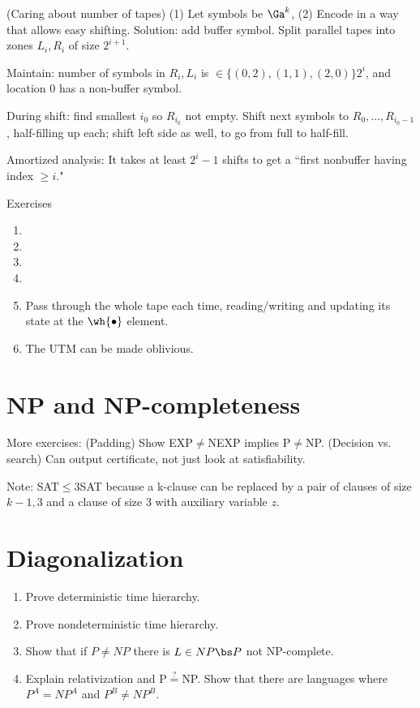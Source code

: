 (Caring about number of tapes) (1) Let symbols be $\Ga^k$, (2) Encode in a way that allows easy shifting. Solution: add buffer symbol. Split parallel tapes into zones $L_i,R_i$ of size $2^{i+1}$. 

Maintain: number of symbols in $R_i,L_i$ is $\in\{(0,2),(1,1),(2,0)\}2^i$, and location 0 has a non-buffer symbol.

During shift: find smallest $i_0$ so $R_{i_0}$ not empty. Shift next symbols to $R_0,\ldots,R_{i_0-1}$, half-filling up each; shift left side as well, to go from full to half-fill.

Amortized analysis: It takes at least $2^i-1$ shifts to get a ``first nonbuffer having index $\ge i$."

Exercises
\begin{enumerate}
\item
\item
\item
\item 
\item
Pass through the whole tape each time, reading/writing and updating its state at the $\wh{\bullet}$ element.
\item
The UTM can be made oblivious. 
\end{enumerate}
\section{NP and NP-completeness}

More exercises: (Padding) Show EXP$\ne$NEXP implies P$\ne$NP. (Decision vs. search) Can output certificate, not just look at satisfiability.

Note: SAT$\le$3SAT because a k-clause can be replaced by a pair of clauses of size $k-1,3$ and a clause of size 3 with auxiliary variable $z$.
\section{Diagonalization}
\begin{enumerate}
\item Prove deterministic time hierarchy.
\item Prove nondeterministic time hierarchy.
\item Show that if $P\ne NP$ there is $L\in NP\bs P$ not NP-complete.
\item Explain relativization and P$\stackrel ?=$NP. Show that there are languages where $P^A=NP^A$ and $P^B\ne NP^B$.  
\end{enumerate}

